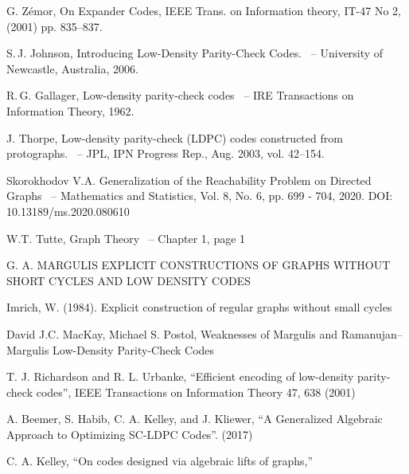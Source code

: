 \documentclass[a4paper,fleqn]{cas-sc}
\newcounter{definition}[section]
\begin{document}
\begin{thebibliography}{0}

G. Zémor, On Expander Codes, IEEE Trans. on Information theory, IT-47
No 2, (2001) pp. 835–837.
  
S.\,J. Johnson,
Introducing Low-Density Parity-Check Codes.
~-- University of Newcastle, Australia, 2006.

R.\,G. Gallager,
Low-density parity-check codes
~-- IRE Transactions on Information Theory, 1962.

J. Thorpe,
Low-density parity-check (LDPC) codes constructed from protographs.
~-- JPL, IPN Progress Rep., Aug. 2003, vol. 42–154.

Skorokhodov V.A. Generalization of the Reachability Problem on Directed Graphs
~-- Mathematics and Statistics, Vol. 8, No. 6, pp. 699 - 704, 2020. DOI: 10.13189/ms.2020.080610

W.T. Tutte, Graph Theory
~-- %
Chapter 1, page 1

G. A. MARGULIS EXPLICIT CONSTRUCTIONS OF GRAPHS WITHOUT SHORT CYCLES AND LOW DENSITY CODES 

Imrich, W. (1984). Explicit construction of regular graphs without small cycles

David J.C. MacKay, Michael S. Postol, Weaknesses of Margulis and Ramanujan–Margulis Low-Density Parity-Check Codes


T. J. Richardson and R. L. Urbanke, “Efficient encoding of low-density parity-check codes”, IEEE Transactions on Information Theory 47, 638 (2001)

A. Beemer, S. Habib, C. A. Kelley, and J. Kliewer, “A Generalized Algebraic Approach to Optimizing SC-LDPC Codes”. (2017)

C. A. Kelley, “On codes designed via algebraic lifts of graphs,”


\end{thebibliography}
\end{document}
